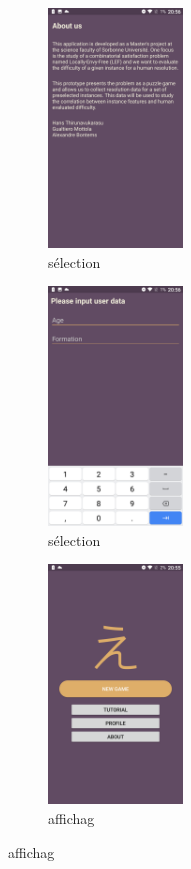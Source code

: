 \documentclass[a4paper, 10pt]{article}
\begin{document}
\begin{figure}[h!]
    \centering
    \begin{subfigure}[a]{0.23\textwidth}
        \centering
        \includegraphics[height=2.5in]{abou}
        \caption{sélection}
    \end{subfigure}
        \begin{subfigure}[b]{0.23\textwidth}
        \centering
        \includegraphics[height=2.5in]{infor}
        \caption{sélection}
    \end{subfigure}%
        \begin{subfigure}[c]{0.23\textwidth}
        \centering
        \includegraphics[height=2.5in]{main}
        \caption{affichag}
    \end{subfigure}%

\end{figure}
\end{document}
